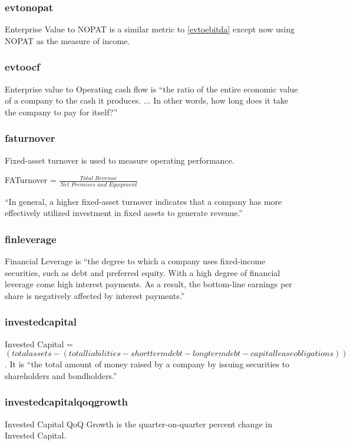\subsubsection{evtonopat}
Enterprise Value to NOPAT is a similar metric to \ref{evtoebitda} except now using NOPAT as the measure of income.

\subsubsection{evtoocf}
Enterprise value to Operating cash flow is ``the ratio of the entire economic value of a company to the cash it produces. ... In other words, how long does it take the company to pay for itself?''\cite{intrinioDataTags}

\subsubsection{faturnover}
Fixed-asset turnover is used to measure operating performance. \newline

FATurnover = $\frac{Total \,\, Revenue}{Net \,\, Premises \,\, and \,\, Equipment}$ \newline

``In general, a higher fixed-asset turnover indicates that a company has more effectively utilized investment in fixed assets to generate revenue.''\cite{intrinioDataTags}

\subsubsection{finleverage}
Financial Leverage is ``the degree to which a company uses fixed-income securities, such as debt and preferred equity. With a high degree of financial leverage come high interest payments. As a result, the bottom-line earnings per share is negatively affected by interest payments.''\cite{intrinioDataTags}

\subsubsection{investedcapital}
Invested Capital = $(totalassets - (totalliabilities - shorttermdebt - longtermdebt - capitalleaseobligations))$. It is ``the total amount of money raised by a company by issuing securities to shareholders and bondholders.''\cite{intrinioDataTags}

\subsubsection{investedcapitalqoqgrowth}
Invested Capital QoQ Growth is the quarter-on-quarter percent change in Invested Capital.

